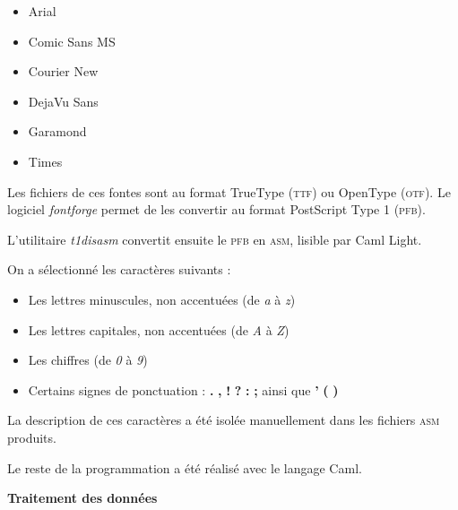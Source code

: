 \documentclass[10pt,twoside,french,a4paper]{article}
\begin{document}
\begin{itemize}

\item
  Arial

\item
  Comic Sans MS

\item
  Courier New

\item
  DejaVu Sans

\item
  Garamond

\item
  Times

\end{itemize}

\medskip

Les fichiers de ces fontes sont au format TrueType (\textsc{ttf}) ou OpenType (\textsc{otf}). Le logiciel \emph{fontforge} permet de les convertir au format PostScript Type 1 (\textsc{pfb}).

L'utilitaire \emph{t1disasm} convertit ensuite le \textsc{pfb} en \textsc{asm}, lisible par Caml Light.

\medskip

On a sélectionné les caractères suivants :

\begin{itemize}

\item
  Les lettres minuscules, non accentuées (de \emph{a} à \emph{z})

\item
  Les lettres capitales, non accentuées (de \emph{A} à \emph{Z})

\item
  Les chiffres (de \emph{0} à \emph{9})

\item
  Certains signes de ponctuation : \textbf{.} \textbf{,} \textbf{!} \textbf{?} \textbf{:} \textbf{;} ainsi que \textbf{'} \textbf{(} \textbf{)}

\end{itemize}

La description de ces caractères a été isolée manuellement dans les fichiers \textsc{asm} produits.

\medskip

Le reste de la programmation a été réalisé avec le langage Caml.

\pagebreak

\noindent \textbf{Traitement des données}
\end{document}

